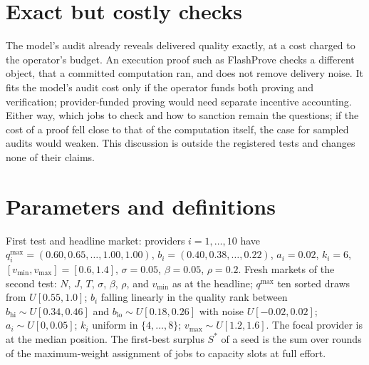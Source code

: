 \documentclass[11pt]{article}
\begin{document}
\FloatBarrier
\section{Exact but costly checks}\label{sec:app-exact}
The model's audit already reveals delivered quality exactly, at a cost charged to the operator's budget. An execution proof such as FlashProve checks a different object, that a committed computation ran, and does not remove delivery noise. It fits the model's audit cost only if the operator funds both proving and verification; provider-funded proving would need separate incentive accounting. Either way, which jobs to check and how to sanction remain the questions; if the cost of a proof fell close to that of the computation itself, the case for sampled audits would weaken. This discussion is outside the registered tests and changes none of their claims.

\FloatBarrier
\section{Parameters and definitions}\label{sec:app-params}\label{app:params}
First test and headline market: providers $i = 1, \dots, 10$ have $q^{\max}_i = (0.60, 0.65, \dots, 1.00, 1.00)$, $b_i = (0.40, 0.38, \dots, 0.22)$, $a_i = 0.02$, $k_i = 6$, $[v_{\min}, v_{\max}] = [0.6, 1.4]$, $\sigma = 0.05$, $\beta = 0.05$, $\rho = 0.2$. Fresh markets of the second test: $N$, $J$, $T$, $\sigma$, $\beta$, $\rho$, and $v_{\min}$ as at the headline; $q^{\max}$ ten sorted draws from $U[0.55, 1.0]$; $b_i$ falling linearly in the quality rank between $b_{\mathrm{hi}} \sim U[0.34, 0.46]$ and $b_{\mathrm{lo}} \sim U[0.18, 0.26]$ with noise $U[-0.02, 0.02]$; $a_i \sim U[0, 0.05]$; $k_i$ uniform in $\{4, \dots, 8\}$; $v_{\max} \sim U[1.2, 1.6]$. The focal provider is at the median position. The first-best surplus $S^*$ of a seed is the sum over rounds of the maximum-weight assignment of jobs to capacity slots at full effort.

\begin{table}[h]\centering\small
{}
\caption{Development comparator selection (before the lock; development records): each credibility configuration's selected D2+H3 attack gain and gross efficiency at the inner search budget, and the two configurations rechecked at full budget, at the headline market and dev0, with R3's pacing and the fixed pair. Score: the development objective, the minimum over markets and families of the smaller of an efficiency margin and a gain margin, with the market and family that decide it; the efficiency margin was the smaller at every configuration.}\label{tab:comparator-dev}
\end{table}
\end{document}
